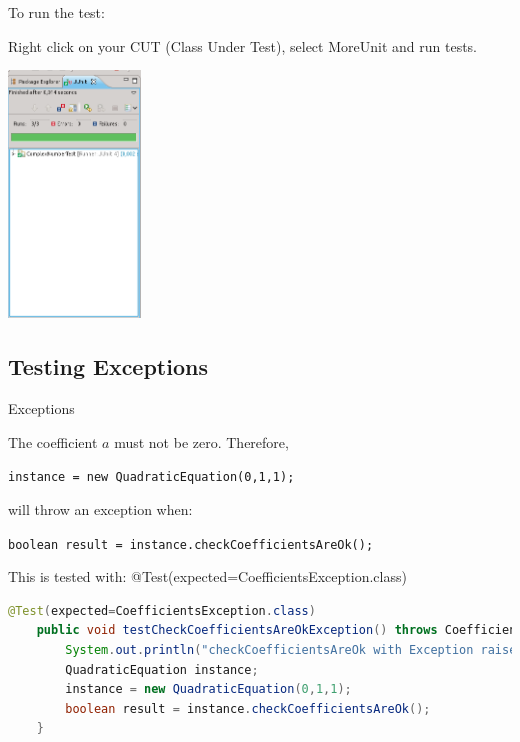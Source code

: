 \documentclass[11pt, xcolor=svgnames]{beamer}
\begin{document}

\begin{frame}

To run the test: 

Right click on your CUT (Class Under Test), select MoreUnit and run tests.

\begin{center}
 \includegraphics[width=100pt]{./figs/Results}
\end{center}

\end{frame}





\subsection{Testing Exceptions}



\begin{frame}[fragile]{Exceptions}

The coefficient $a$ must not be zero. Therefore,

\texttt{instance = new QuadraticEquation(0,1,1);}

will throw an exception when:

\texttt{boolean result = instance.checkCoefficientsAreOk();}

This is tested with:
    @Test(expected=CoefficientsException.class)

\begin{lstlisting}[language=JAVA,basicstyle=\scriptsize]
    @Test(expected=CoefficientsException.class)
    public void testCheckCoefficientsAreOkException() throws CoefficientsException {
        System.out.println("checkCoefficientsAreOk with Exception raised");
        QuadraticEquation instance;
        instance = new QuadraticEquation(0,1,1);
        boolean result = instance.checkCoefficientsAreOk();
    }
\end{lstlisting}

\end{frame}
\end{document}
